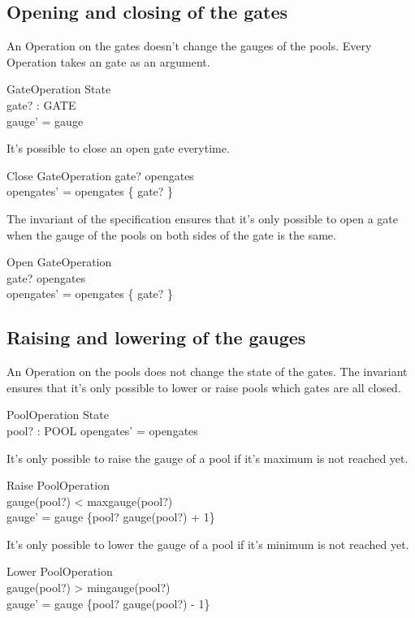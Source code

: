 \documentclass[a4paper]{article}
\begin{document}
\subsection{Opening and closing of the gates}
An Operation on the gates doesn't change the gauges of the pools. Every
Operation takes an gate as an argument.
\begin{schema}{GateOperation}
  \Delta State\\
  gate? : GATE\\
  \where
  gauge' = gauge
\end{schema}
It's possible to close an open gate everytime.
\begin{schema}{Close}
  GateOperation
  \where
  gate? \in opengates\\
  opengates' = opengates \setminus \{ gate? \}
\end{schema}
The invariant of the specification ensures that it's only
possible to open a gate when the gauge of the pools
on both sides of the gate is the same.
\begin{schema}{Open}
  GateOperation\\
  \where
  gate? \notin opengates\\
  opengates' = opengates \cup \{ gate? \}\\
\end{schema}

\subsection{Raising and lowering of the gauges}
An Operation on the pools does not change the state of the gates.
The invariant ensures that it's only possible to lower or raise pools
which gates are all closed.
\begin{schema}{PoolOperation}
  \Delta State\\
  pool? : POOL
  \where
  opengates' = opengates\\
\end{schema}
It's only possible to raise the gauge of a pool if it's maximum is
not reached yet.
\begin{schema}{Raise}
  PoolOperation\\
  \where
  gauge(pool?) < maxgauge(pool?)\\
  gauge' = gauge \oplus \{pool? \mapsto gauge(pool?) + 1\}\\
\end{schema}
It's only possible to lower the gauge of a pool if it's minimum is
not reached yet.
\begin{schema}{Lower}
  PoolOperation\\
  \where
  gauge(pool?) > mingauge(pool?)\\
  gauge' = gauge \oplus \{pool? \mapsto gauge(pool?) - 1\}\\
\end{schema}
  
\end{document}
